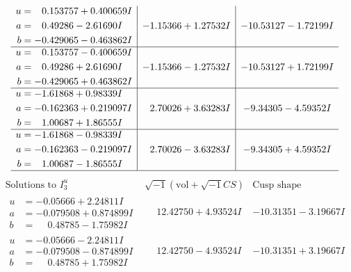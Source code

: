 \documentclass[1p]{elsarticle_modified}
\theoremstyle{definition}
\newcommand{\I}{\sqrt{-1}}
\begin{document}
$$\begin{array}{c|c|c}
\begin{aligned}
u &= \phantom{-}0.153757 + 0.400659 I \\
a &= \phantom{-}0.49286 - 2.61690 I \\
b &= -0.429065 - 0.463862 I\end{aligned}
 & -1.15366 + 1.27532 I & -10.53127 - 1.72199 I \\ \hline\begin{aligned}
u &= \phantom{-}0.153757 - 0.400659 I \\
a &= \phantom{-}0.49286 + 2.61690 I \\
b &= -0.429065 + 0.463862 I\end{aligned}
 & -1.15366 - 1.27532 I & -10.53127 + 1.72199 I \\ \hline\begin{aligned}
u &= -1.61868 + 0.98339 I \\
a &= -0.162363 + 0.219097 I \\
b &= \phantom{-}1.00687 + 1.86555 I\end{aligned}
 & \phantom{-}2.70026 + 3.63283 I & -9.34305 - 4.59352 I \\ \hline\begin{aligned}
u &= -1.61868 - 0.98339 I \\
a &= -0.162363 - 0.219097 I \\
b &= \phantom{-}1.00687 - 1.86555 I\end{aligned}
 & \phantom{-}2.70026 - 3.63283 I & -9.34305 + 4.59352 I\\
 \hline 
 \end{array}$$\newpage$$\begin{array}{c|c|c}  
\text{Solutions to }I^u_{3}& \I (\text{vol} + \sqrt{-1}CS) & \text{Cusp shape}\\
 \hline 
\begin{aligned}
u &= -0.05666 + 2.24811 I \\
a &= -0.079508 + 0.874899 I \\
b &= \phantom{-}0.48785 - 1.75982 I\end{aligned}
 & \phantom{-}12.42750 + 4.93524 I & -10.31351 - 3.19667 I \\ \hline\begin{aligned}
u &= -0.05666 - 2.24811 I \\
a &= -0.079508 - 0.874899 I \\
b &= \phantom{-}0.48785 + 1.75982 I\end{aligned}
 & \phantom{-}12.42750 - 4.93524 I & -10.31351 + 3.19667 I \\ \hline\begin{aligned}

\end{aligned}
\end{array}$$
\end{document}
